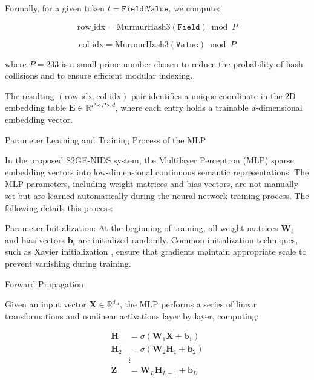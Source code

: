 \begin{ZhChapter}
    Formally, for a given token $t = \texttt{Field:Value}$, we compute:

    \begin{equation}
        \text{row\_idx} = \text{MurmurHash3}(\texttt{Field}) \bmod P
    \end{equation}

    \begin{equation}
        \text{col\_idx} = \text{MurmurHash3}(\texttt{Value}) \bmod P
    \end{equation}

    where $P = 233$ is a small prime number chosen to reduce the probability of hash collisions and to ensure efficient modular indexing.

    The resulting $(\text{row\_idx}, \text{col\_idx})$ pair identifies a unique coordinate in the 2D embedding table $\mathbf{E} \in \mathbb{R}^{P \times P \times d}$, where each entry holds a trainable $d$-dimensional embedding vector.


    Parameter Learning and Training Process of the MLP

    In the proposed S2GE-NIDS system, the Multilayer Perceptron (MLP) sparse embedding vectors into low-dimensional continuous semantic representations. The MLP parameters, including weight matrices and bias vectors, are not manually set but are learned automatically during the neural network training process. The following details this process:


    Parameter Initialization: At the beginning of training, all weight matrices $\mathbf{W}_i$ and bias vectors $\mathbf{b}_i$ are initialized randomly. Common initialization techniques, such as Xavier initialization \cite{glorot2010understanding}, ensure that gradients maintain appropriate scale to prevent vanishing during training.

    Forward Propagation

    Given an input vector $\mathbf{X} \in \mathbb{R}^{d_{\text{in}}}$, the MLP performs a series of linear transformations and nonlinear activations layer by layer, computing:


    \begin{align}
        \mathbf{H}_1 & = \sigma(\mathbf{W}_1 \mathbf{X} + \mathbf{b}_1)   \\
        \mathbf{H}_2 & = \sigma(\mathbf{W}_2 \mathbf{H}_1 + \mathbf{b}_2) \\
                     & \vdots \nonumber                                   \\
        \mathbf{Z}   & = \mathbf{W}_L \mathbf{H}_{L-1} + \mathbf{b}_L
    \end{align}


\end{ZhChapter}
